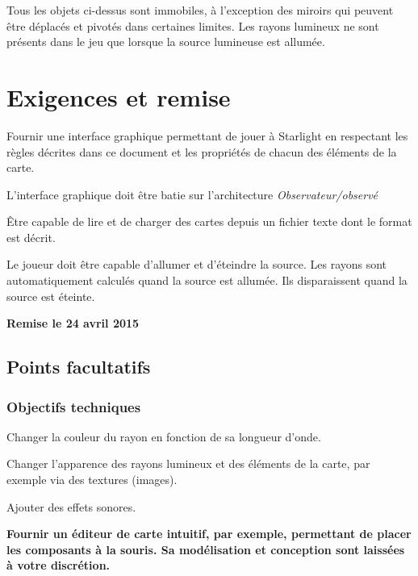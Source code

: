 Tous les objets ci-\/dessus sont immobiles, à l'exception des miroirs qui peuvent être déplacés et pivotés dans certaines limites. Les rayons lumineux ne sont présents dans le jeu que lorsque la source lumineuse est allumée.





\section*{Exigences et remise}


\begin{DoxyItemize}
\item Fournir une interface graphique permettant de jouer à Starlight en respectant les règles décrites dans ce document et les propriétés de chacun des éléments de la carte.
\item L'interface graphique doit être batie sur l'architecture {\itshape Observateur/observé}
\item Être capable de lire et de charger des cartes depuis un fichier texte dont le format est décrit.
\item Le joueur doit être capable d'allumer et d'éteindre la source. Les rayons sont automatiquement calculés quand la source est allumée. Ils disparaissent quand la source est éteinte.
\item {\bfseries Remise le 24 avril 2015}
\end{DoxyItemize}





\subsection*{Points facultatifs}

\subsubsection*{Objectifs techniques}


\begin{DoxyItemize}
\item Changer la couleur du rayon en fonction de sa longueur d'onde.
\item Changer l'apparence des rayons lumineux et des éléments de la carte, par exemple via des textures (images).
\item Ajouter des effets sonores.
\item {\bfseries Fournir un éditeur de carte intuitif, par exemple, permettant de placer les composants à la souris. Sa modélisation et conception sont laissées à votre discrétion.}
\end{DoxyItemize}

